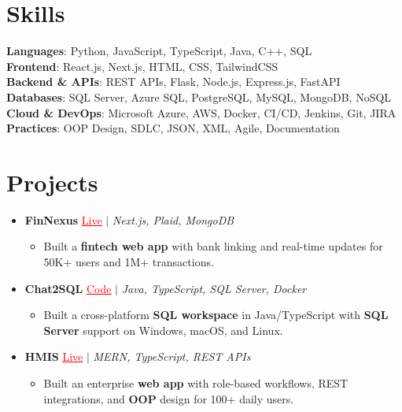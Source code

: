 \documentclass[letterpaper,10pt]{article}
\newcommand{\resumeItem}[1]{\item\small{{#1 \vspace{-2pt}}}}
\newcommand{\resumeProjectHeading}[1]{\item \small #1 \vspace{-2pt}}
\newcommand{\resumeSubHeadingListStart}{\begin{itemize}[leftmargin=0.0in, label={}]}
\newcommand{\resumeSubHeadingListEnd}{\end{itemize}}
\newcommand{\resumeProjItemListStart}{\begin{itemize}[leftmargin=0.15in,label=\textbullet,itemsep=0pt,topsep=0pt,parsep=0pt,partopsep=0pt]}
\newcommand{\resumeProjItemListEnd}{\end{itemize}\vspace{-4pt}}
\begin{document}
\section{Skills}
\begin{itemize}[leftmargin=0.15in, label={}]
\small{\item{
\textbf{Languages}: Python, JavaScript, TypeScript, Java, C++, SQL \\
\textbf{Frontend}: React.js, Next.js, HTML, CSS, TailwindCSS \\
\textbf{Backend \& APIs}: REST APIs, Flask, Node.js, Express.js, FastAPI \\
\textbf{Databases}: SQL Server, Azure SQL, PostgreSQL, MySQL, MongoDB, NoSQL \\
\textbf{Cloud \& DevOps}: Microsoft Azure, AWS, Docker, CI/CD, Jenkins, Git, JIRA \\
\textbf{Practices}: OOP Design, SDLC, JSON, XML, Agile, Documentation
}}
\end{itemize}
\vspace{-6pt}
\section{Projects}
\resumeSubHeadingListStart
\vspace{-2pt}
\resumeProjectHeading{\textbf{FinNexus} {\href{https://fin-nexus.vercel.app/}{\textcolor{red}{\underline{Live}}}} $|$ \emph{Next.js, Plaid, MongoDB}}
\resumeProjItemListStart
\resumeItem{Built a \textbf{fintech web app} with bank linking and real-time updates for 50K+ users and 1M+ transactions.}
\resumeProjItemListEnd
\vspace{3pt}
\resumeProjectHeading{\textbf{Chat2SQL} {\href{https://github.com/SAHAJ-BHADJA/Chat2SQL}{\textcolor{red}{\underline{Code}}}} $|$ \emph{Java, TypeScript, SQL Server, Docker}}
\resumeProjItemListStart
\resumeItem{Built a cross-platform \textbf{SQL workspace} in Java/TypeScript with \textbf{SQL Server} support on Windows, macOS, and Linux.}
\resumeProjItemListEnd
\vspace{3pt}
\resumeProjectHeading{\textbf{HMIS} {\href{https://hims-rouge.vercel.app/}{\textcolor{red}{\underline{Live}}}} $|$ \emph{MERN, TypeScript, REST APIs}}
\resumeProjItemListStart
\resumeItem{Built an enterprise \textbf{web app} with role-based workflows, REST integrations, and \textbf{OOP} design for 100+ daily users.}
\resumeProjItemListEnd
\resumeSubHeadingListEnd
\end{document}
